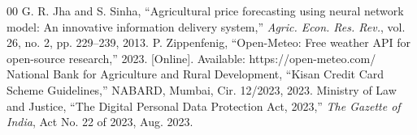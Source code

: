 \documentclass[conference]{IEEEtran}
\begin{document}
\begin{thebibliography}{00}
 G. R. Jha and S. Sinha, ``Agricultural price forecasting using neural network model: An innovative information delivery system,'' \textit{Agric. Econ. Res. Rev.}, vol. 26, no. 2, pp. 229--239, 2013.
 P. Zippenfenig, ``Open-Meteo: Free weather API for open-source research,'' 2023. [Online]. Available: https://open-meteo.com/
 National Bank for Agriculture and Rural Development, ``Kisan Credit Card Scheme Guidelines,'' NABARD, Mumbai, Cir. 12/2023, 2023.
 Ministry of Law and Justice, ``The Digital Personal Data Protection Act, 2023,'' \textit{The Gazette of India}, Act No. 22 of 2023, Aug. 2023.
\end{thebibliography}
\end{document}
